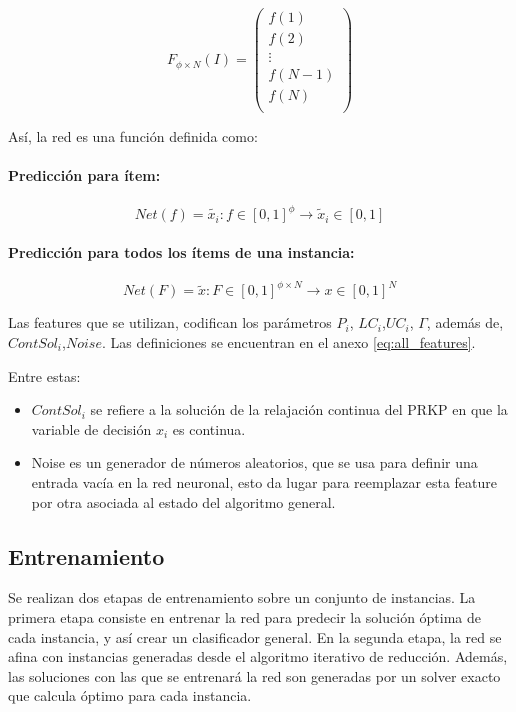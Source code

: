\documentclass[spanish, a4paper, 12pt, openany,final]{book}
\begin{document}
\begin{equation}
F_{\phi \times N}(I) = 
\left( 
\begin{matrix}
	f(1)\\
	f(2)\\
	\vdots \\
	f(N-1)\\
	f(N)\\
\end{matrix}
\right)
\label{eq:feature_matrix}
\end{equation}


Así, la red es una función definida como:
\paragraph*{Predicción para ítem:}
$$
	Net(f) = \tilde{x_i}: f\in [0,1]^\phi \rightarrow \tilde{x}_i \in[0,1]
$$

\paragraph*{Predicción para todos los ítems de una instancia:}

$$
	Net(F) = \tilde{x}: F\in [0,1]^{\phi\times N} \rightarrow x \in[0,1]^{N}
$$

Las features que se utilizan, codifican los parámetros $P_i$, $LC_i$,$UC_i$, $\Gamma$, además de, $ContSol_i$,$Noise$. Las definiciones se encuentran en el anexo \ref{eq:all_features}.

Entre estas:
\begin{itemize}
	\item $ContSol_i$ se refiere a la solución de la relajación continua del PRKP en que la variable de decisión $x_i$ es continua.
	\item Noise es un generador de números aleatorios, que se usa para definir una entrada vacía en la red neuronal, esto da lugar para reemplazar esta feature por otra asociada al estado del algoritmo general.
\end{itemize}


\subsection{Entrenamiento}

Se realizan dos etapas de entrenamiento sobre un conjunto de instancias. La primera etapa consiste en entrenar la red para predecir la solución óptima de cada instancia, y así crear un clasificador general. En la segunda etapa, la red se afina con instancias generadas desde el algoritmo iterativo de reducción. Además, las soluciones con las que se entrenará la red son generadas por un solver exacto que calcula óptimo para cada instancia. 
\end{document}
